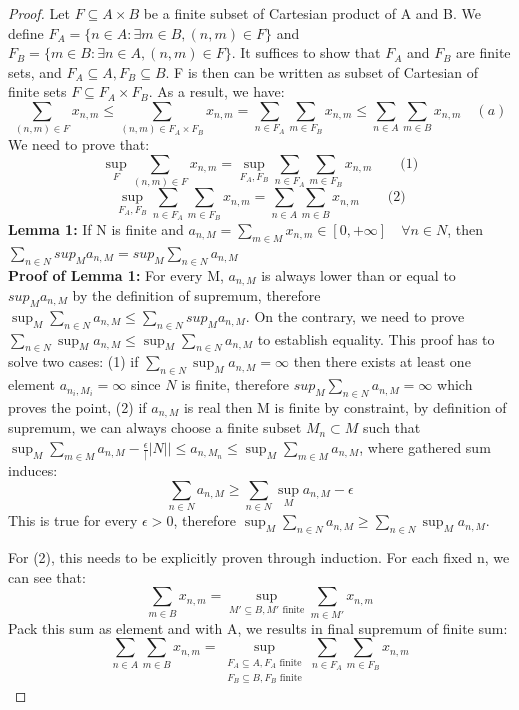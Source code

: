\begin{proof}
    Let $F \subseteq A \times B$ be a finite subset of Cartesian product of A and B. We define $F_A = \{n \in A: \exists m \in B, (n, m) \in F\}$ and $F_B = \{m \in B: \exists n \in A, (n, m) \in F\}$. It suffices to show that $F_A$ and $F_B$ are finite sets, and $F_A \subseteq A, F_B \subseteq B$. F is then can be written as subset of Cartesian of finite sets $F \subseteq F_A \times F_B$. As a result, we have:
    \[
        \sum_{(n,m) \in F} x_{n,m} \leq \sum_{(n, m) \in F_A \times F_B} x_{n,m} = \sum_{n\in F_A}\sum_{m\in F_B} x_{n,m} \leq \sum_{n\in A}\sum_{m\in B} x_{n,m} \quad (a)
    \]
    We need to prove that:     
    \[
    \sup_{F}  \sum_{(n,m) \in F} x_{n,m} = \sup_{F_A, F_B} \sum_{n\in F_A}\sum_{m\in F_B} x_{n,m}\qquad \text{(1)} 
    \]
    \[
    \sup_{F_A, F_B} \sum_{n\in F_A}\sum_{m\in F_B} x_{n,m} = \sum_{n \in A}\sum_{m \in B} x_{n,m}\qquad \text{(2)} 
    \]
    \textbf{Lemma 1:} If N is finite and $a_{n, M} = \sum_{m \in M} x_{n,m} \in [0, +\infty]\quad \forall n\in N$, then $\sum_{n\in N} sup_{M} a_{n,M} = sup_{M} \sum_{n\in N} a_{n,M}$ \\
    \textbf{Proof of Lemma 1:} For every M, $a_{n, M}$ is always lower than or equal to $sup_M a_{n,M}$ by the definition of supremum, therefore $\sup_M \sum_{n\in N} a_{n, M} \leq \sum_{n\in N} sup_M a_{n,M}$. On the contrary, we need to prove $\sum_{n\in N}  \sup_M a_{n,M} \leq\sup_M \sum_{n\in N} a_{n, M}$ to establish equality. This proof has to solve two cases: (1) if $\sum_{n\in N} \sup_M a_{n, M} = \infty$ then there exists at least one element $a_{n_i, M_i} = \infty$ since $N$ is finite, therefore $sup_{M} \sum_{n\in N} a_{n,M} = \infty$ which proves the point, (2) if $a_{n,M}$ is real then M is finite by constraint, by definition of supremum, we can always choose a finite subset $M_n \subset M$ such that $\sup_{M} \sum_{m\in M} a_{n, M} - \frac \epsilon ||N|| \leq a_{n, M_n} \leq \sup_{M} \sum_{m\in M} a_{n, M}$, where gathered sum induces: 
    \[
    \sum_{n\in N} a_{n,M} \geq \sum_{n\in N} \sup_M a_{n,M} - \epsilon
    \]
    This is true for every $\epsilon > 0$, therefore $\sup_{M} \sum_{n\in N} a_{n,M} \geq \sum_{n\in N} \sup_M a_{n,M}$.

    For (2), this needs to be explicitly proven through induction. For each fixed n, we can see that: 
    \[
    \sum_{m\in B} x_{n,m} = \sup_{M' \subseteq B, M' \text{ finite}} \sum_{m \in M'} x_{n,m}
    \]
    Pack this sum as element and with A, we results in final supremum of finite sum:
    \[
        \sum_{n\in A}\sum_{m\in B} x_{n,m} = \sup_{\substack{F_A \subseteq A, F_A \text{ finite} \\ F_B \subseteq B, F_B \text{ finite}}} \sum_{n\in F_A}\sum_{m\in F_B} x_{n,m} 
    \]



\end{proof}
